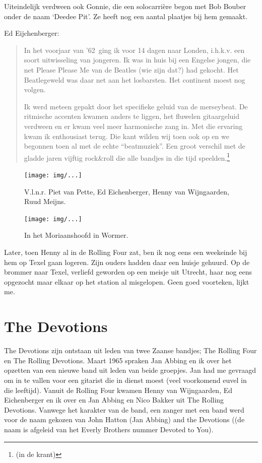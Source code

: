 \documentclass[12pt,twoside]{memoir}
\begin{document}
Uiteindelijk verdween ook Gonnie, die een solocarrière begon met Bob Bouber onder de naam `Deedee Pit'. Ze heeft nog een aantal plaatjes bij hem gemaakt.

Ed Eijchenberger: 

\begin{quote}
In het voorjaar van '62 ging ik voor 14 dagen naar Londen, i.h.k.v. een soort uitwisseling van jongeren. Ik was in huis bij een Engelse jongen, die net Please Please Me van de Beatles (wie zijn dat?) had gekocht. Het Beatlegeweld was daar net aan het losbarsten. Het continent moest nog volgen. 

Ik werd meteen gepakt door het specifieke geluid van de merseybeat. De ritmische accenten kwamen anders te liggen, het fluwelen gitaargeluid verdween en er kwam veel meer harmonische zang in. Met die ervaring kwam ik enthousiast terug. Die kant wilden wij toen ook op en we begonnen toen al met de echte “beatmuziek”. Een groot verschil met de gladde jaren vijftig rock&roll die alle bandjes in die tijd speelden.\footnote{(in de krant)}
\end{quote}

\begin{figure}[t]
\texttt{[image: img/...]}
\caption{V.l.n.r. Piet van Pette, Ed Eichenberger, Henny van Wijngaarden, Ruud Meijns.}
\end{figure}
 
\begin{figure}[t]
\texttt{[image: img/...]}
\caption{In het Moriaanshoofd in Wormer.}
\end{figure}

Later, toen Henny al in de Rolling Four zat, ben ik nog eens een weekeinde bij hem op Texel gaan logeren. Zijn ouders hadden daar een huisje gehuurd. Op de brommer naar Texel, verliefd geworden op een meisje uit Utrecht, haar nog eens opgezocht maar elkaar op het station al misgelopen. Geen goed voorteken, lijkt me.

\chapter{The Devotions} %
\label{cha:devotions}

The Devotions zijn ontstaan uit leden van twee Zaanse bandjes; The Rolling Four en The Rolling Devotions. Maart 1965 spraken Jan Abbing en ik over het opzetten van een nieuwe band uit leden van beide groepjes. Jan had me gevraagd om in te vallen voor een gitarist die in dienst moest (veel voorkomend euvel in die leeftijd). Vanuit de Rolling Four kwamen Henny van Wijngaarden, Ed Eichenberger en ik over en Jan Abbing en Nico Bakker uit The Rolling Devotions. Vanwege het karakter van de band, een zanger met een band werd voor de naam gekozen van John Hatton (Jan Abbing) and the Devotions ((de naam is afgeleid van het Everly Brothers nummer Devoted to You).
\end{document}

